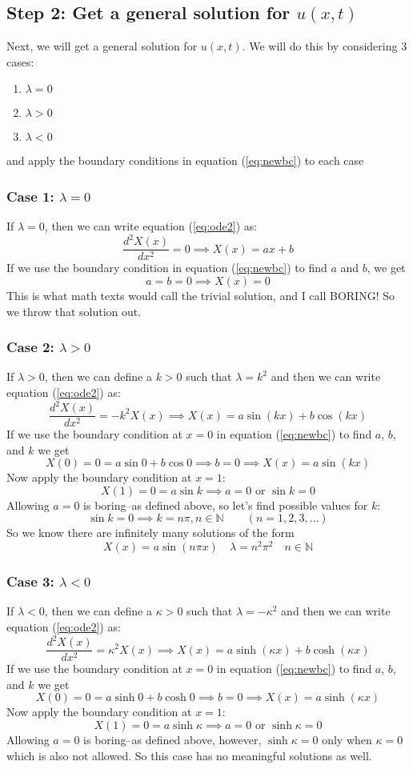 \documentclass{article}
\begin{document}
\subsection{Step 2: Get a general solution for $u(x,t)$}
Next, we will get a general solution for $u(x,t)$. We will do this by considering 3 cases:
\begin{enumerate}
  \item $\lambda = 0$
  \item $\lambda > 0$
  \item $\lambda < 0$
\end{enumerate}
and apply the boundary conditions in equation (\ref{eq:newbc}) to each case

\subsubsection{Case 1: $\lambda = 0$}
If $\lambda = 0$, then we can write equation (\ref{eq:ode2}) as:
\[
  \frac{d^2X(x)}{dx^2} = 0 \implies X(x) = ax+b
\]
If we use the boundary condition in equation (\ref{eq:newbc}) to find $a$ and $b$, we get
\[
  a = b = 0 \implies X(x) = 0
\]
This is what math texts would call the trivial solution, and I call BORING! So we throw that
solution out.

\subsubsection{Case 2: $\lambda > 0$}
If $\lambda > 0$, then we can define a $k>0$ such that $\lambda = k^2$ and then we
can write equation (\ref{eq:ode2}) as:
\[
  \frac{d^2X(x)}{dx^2} = -k^2 X(x) \implies X(x) = a\sin(kx) + b\cos(kx)
\]
If we use the boundary condition at $x=0$ in equation (\ref{eq:newbc}) to find $a$, $b$, and
$k$ we get
\[
  X(0) = 0 = a\sin 0 + b \cos 0 \implies b=0 \implies X(x) = a \sin(kx)
\]
Now apply the boundary condition at $x=1$:
\[
  X(1) = 0 = a \sin k \implies a = 0 \text{ or } \sin k=0
\]
Allowing $a=0$ is boring--as defined above, so let's find possible values for $k$:
\[
  \sin k = 0 \implies k = n\pi, n\in\mathbb{N} \qquad (n=1, 2, 3, \ldots)
\]
So we know there are infinitely many solutions of the form
\[
  X(x) = a \sin(n\pi x) \quad \lambda = n^2\pi^2 \quad n\in\mathbb{N}
\]

\subsubsection{Case 3: $\lambda < 0$}
If $\lambda < 0$, then we can define a $\kappa>0$ such that $\lambda = -\kappa^2$ and then we
can write equation (\ref{eq:ode2}) as:
\[
  \frac{d^2X(x)}{dx^2} = \kappa^2 X(x) \implies X(x) = a\sinh(\kappa x) + b\cosh(\kappa x)
\]
If we use the boundary condition at $x=0$ in equation (\ref{eq:newbc}) to find $a$, $b$, and
$k$ we get
\[
  X(0) = 0 = a\sinh 0 + b \cosh 0 \implies b=0 \implies X(x) = a \sinh(\kappa x)
\]
Now apply the boundary condition at $x=1$:
\[
  X(1) = 0 = a \sinh \kappa \implies a = 0 \text{ or } \sinh \kappa=0
\]
Allowing $a=0$ is boring--as defined above, however, $\sinh \kappa = 0$ only when $\kappa=0$
which is also not allowed. So this case has no meaningful solutions as well.
\end{document}

